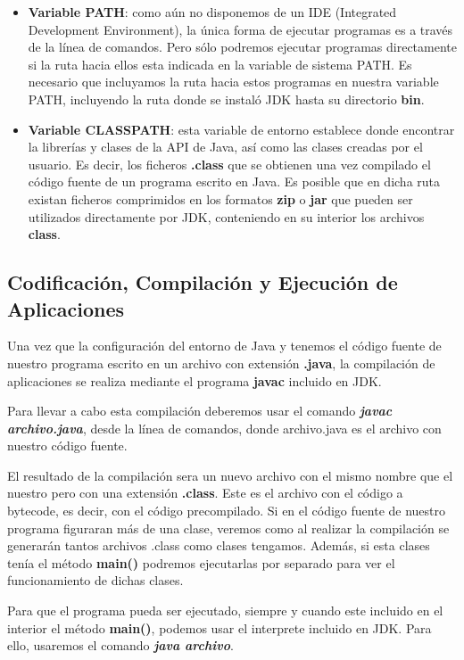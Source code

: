 \begin{itemize}
    \item \textbf{Variable PATH}: como aún no disponemos de un IDE (Integrated Development Environment), la única forma de ejecutar programas es a través de la línea de comandos. Pero sólo podremos ejecutar programas directamente si la ruta hacia ellos esta indicada en la variable de sistema PATH. Es necesario que incluyamos la ruta hacia estos programas en nuestra variable PATH, incluyendo la ruta donde se instaló JDK hasta su directorio \textbf{bin}.

    \item \textbf{Variable CLASSPATH}: esta variable de entorno establece donde encontrar la librerías y clases de la API de Java, así como las clases creadas por el usuario. Es decir, los ficheros \textbf{.class} que se obtienen una vez compilado el código fuente de un programa escrito en Java. Es posible que en dicha ruta existan ficheros comprimidos en los formatos \textbf{zip} o \textbf{jar} que pueden ser utilizados directamente por JDK, conteniendo en su interior los archivos \textbf{class}.
\end{itemize}

\subsection{Codificación, Compilación y Ejecución de Aplicaciones}
Una vez que la configuración del entorno de Java y tenemos el código fuente de nuestro programa escrito en un archivo con extensión \textbf{.java}, la compilación de aplicaciones se realiza mediante el programa \textbf{javac} incluido en JDK.

Para llevar a cabo esta compilación deberemos usar el comando \textbf{\textit{javac archivo.java}}, desde la línea de comandos, donde archivo.java es el archivo con nuestro código fuente.

El resultado de la compilación sera un nuevo archivo con el mismo nombre que el nuestro pero con una extensión \textbf{.class}. Este es el archivo con el código a bytecode, es decir, con el código precompilado. Si en el código fuente de nuestro programa figuraran más de una clase, veremos como al realizar la compilación se generarán tantos archivos .class como clases tengamos. Además, si esta clases tenía el método \textbf{main()} podremos ejecutarlas por separado para ver el funcionamiento de dichas clases.

Para que el programa pueda ser ejecutado, siempre y cuando este incluido en el interior el método \textbf{main()}, podemos usar el interprete incluido en JDK. Para ello, usaremos el comando \textbf{\textit{java archivo}}.

